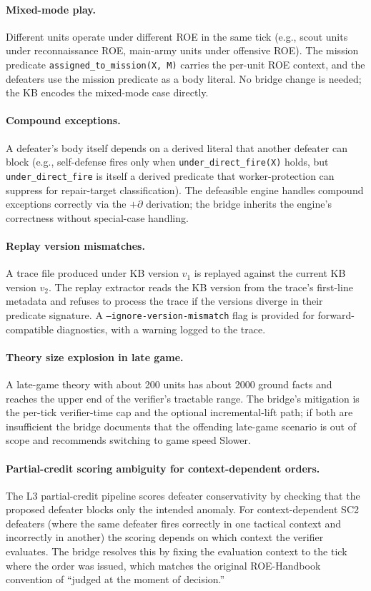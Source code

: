 \documentclass{article}
\theoremstyle{definition}
\begin{document}
\paragraph{Mixed-mode play.} Different units operate under different ROE in the same tick (e.g., scout units under reconnaissance ROE, main-army units under offensive ROE). The mission predicate \texttt{assigned\_to\_mission(X, M)} carries the per-unit ROE context, and the defeaters use the mission predicate as a body literal. No bridge change is needed; the KB encodes the mixed-mode case directly.

\paragraph{Compound exceptions.} A defeater's body itself depends on a derived literal that another defeater can block (e.g., self-defense fires only when \texttt{under\_direct\_fire(X)} holds, but \texttt{under\_direct\_fire} is itself a derived predicate that worker-protection can suppress for repair-target classification). The defeasible engine handles compound exceptions correctly via the $+\partial$ derivation; the bridge inherits the engine's correctness without special-case handling.

\paragraph{Replay version mismatches.} A trace file produced under KB version $v_1$ is replayed against the current KB version $v_2$. The replay extractor reads the KB version from the trace's first-line metadata and refuses to process the trace if the versions diverge in their predicate signature. A \texttt{--ignore-version-mismatch} flag is provided for forward-compatible diagnostics, with a warning logged to the trace.

\paragraph{Theory size explosion in late game.} A late-game theory with about 200 units has about 2000 ground facts and reaches the upper end of the verifier's tractable range. The bridge's mitigation is the per-tick verifier-time cap and the optional incremental-lift path; if both are insufficient the bridge documents that the offending late-game scenario is out of scope and recommends switching to game speed Slower.

\paragraph{Partial-credit scoring ambiguity for context-dependent orders.} The L3 partial-credit pipeline scores defeater conservativity by checking that the proposed defeater blocks only the intended anomaly. For context-dependent SC2 defeaters (where the same defeater fires correctly in one tactical context and incorrectly in another) the scoring depends on which context the verifier evaluates. The bridge resolves this by fixing the evaluation context to the tick where the order was issued, which matches the original ROE-Handbook convention of ``judged at the moment of decision.''
\end{document}
